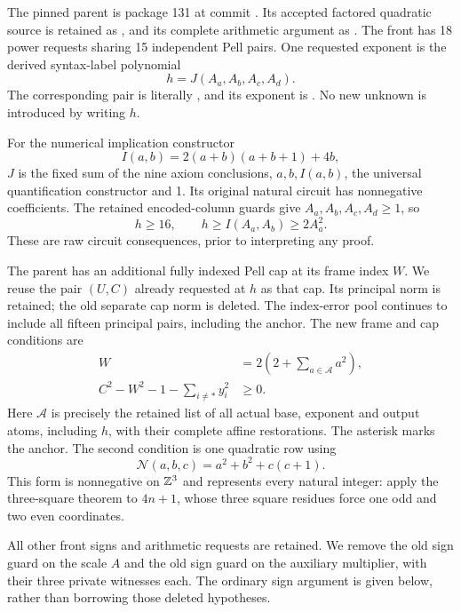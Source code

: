 The pinned parent is package 131 at commit
. Its accepted factored
quadratic source is retained as , and
its complete arithmetic argument as .
The front has 18 power requests sharing 15 independent Pell pairs.
One requested exponent is the derived syntax-label polynomial
\[
 h=J(A_a,A_b,A_c,A_d).
\]
The corresponding pair is literally , and
its exponent is . No new unknown is introduced by
writing $h$.

For the numerical implication constructor
\[
 I(a,b)=2(a+b)(a+b+1)+4b,
\]
$J$ is the fixed sum of the nine axiom conclusions, $a,b,I(a,b)$,
the universal quantification constructor and 1. Its original natural circuit has
nonnegative coefficients. The retained encoded-column guards give
$A_a,A_b,A_c,A_d\ge1$, so
\begin{equation}\label{eq:Janchor}
 h\ge16,\qquad h\ge I(A_a,A_b)\ge2A_a^2.
\end{equation}
These are raw circuit consequences, prior to interpreting any proof.

The parent has an additional fully indexed Pell cap at its frame index
$W$. We reuse the pair $(U,C)$ already requested at $h$ as that cap.
Its principal norm is retained; the old separate cap norm is deleted.
The index-error pool continues to include all fifteen principal pairs,
including the anchor. The new frame and cap conditions are
\begin{align}
 W&=2\left(2+\sum_{a\in\mathcal A}a^2\right),\label{eq:evenframe314}\\
 C^2-W^2-1-\sum_{i\ne *}y_i^2&\ge0.\label{eq:squarecap314}
\end{align}
Here $\mathcal A$ is precisely the retained list of all actual base,
exponent and output atoms, including $h$, with their complete affine
restorations. The asterisk marks the anchor. The second condition is
one quadratic row using
\[
 \mathcal N(a,b,c)=a^2+b^2+c(c+1).
\]
This form is nonnegative on $\mathbb Z^3$ and represents every natural integer:
apply the three-square theorem to $4n+1$, whose three square residues
force one odd and two even coordinates.

All other front signs and arithmetic requests are retained. We remove
the old sign guard on the scale $A$ and the old sign guard on the
auxiliary multiplier, with their three private witnesses each. The
ordinary sign argument is given below, rather than borrowing those
deleted hypotheses.

